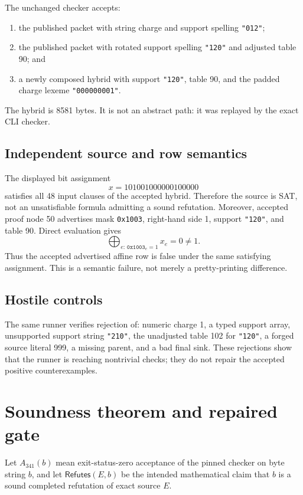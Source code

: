 \documentclass[11pt]{article}
\begin{document}
The unchanged checker accepts:
\begin{enumerate}[label=(A\arabic*)]
\item the published packet with string charge and support spelling
  \texttt{"012"};
\item the published packet with rotated support spelling \texttt{"120"} and
  adjusted table 90; and
\item a newly composed hybrid with support \texttt{"120"}, table 90, and the
  padded charge lexeme \texttt{"000000001"}.
\end{enumerate}
The hybrid is 8581 bytes.  It is not an abstract path: it was replayed by the
exact CLI checker.

\subsection{Independent source and row semantics}

The displayed bit assignment
\[
  x=101001000000100000
\]
satisfies all 48 input clauses of the accepted hybrid.  Therefore the source is
SAT, not an unsatisfiable formula admitting a sound refutation.  Moreover,
accepted proof node 50 advertises mask \texttt{0x1003}, right-hand side 1,
support \texttt{"120"}, and table 90.  Direct evaluation gives
\[
  \bigoplus_{e:\,\texttt{0x1003}_e=1}x_e=0\ne 1.
\]
Thus the accepted advertised affine row is false under the same satisfying
assignment.  This is a semantic failure, not merely a pretty-printing
difference.

\subsection{Hostile controls}

The same runner verifies rejection of: numeric charge 1, a typed support array,
unsupported support string \texttt{"210"}, the unadjusted table 102 for
\texttt{"120"}, a forged source literal 999, a missing parent, and a bad final
sink.  These rejections show that the runner is reaching nontrivial checks; they
do not repair the accepted positive counterexamples.

\section{Soundness theorem and repaired gate}

Let $A_{341}(b)$ mean exit-status-zero acceptance of the pinned checker on byte
string $b$, and let $\mathsf{Refutes}(E,b)$ be the intended mathematical claim
that $b$ is a sound completed refutation of exact source $E$.
\end{document}
